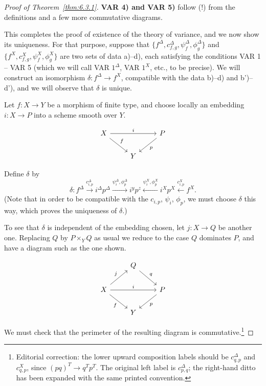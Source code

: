 \begin{proof}[Proof of Theorem~\ref{thm:6.3.1}]
\medskip\noindent\textbf{VAR 4) and VAR 5)} follow (!) from the definitions and a few more commutative diagrams.

This completes the proof of existence of the theory of variance, and we now show its uniqueness. For that purpose, suppose that $\{f^{\Delta}, c^{\Delta}_{f,g}, \psi^{\Delta}_{f}, \phi^{\Delta}_{g}\}$ and $\{f^{X}, c^{X}_{f,g}, \psi^{X}_{f}, \phi^{X}_{g}\}$ are two sets of data a)--d), each satisfying the conditions VAR 1 -- VAR 5 (which we will call VAR $1^{\Delta}$, VAR $1^{X}$, etc., to be precise). We will construct an isomorphism $\delta\colon f^{\Delta}\to f^{X}$, compatible with the data b)--d) and b')--d'), and we will observe that $\delta$ is unique.

Let $f\colon X\to Y$ be a morphism of finite type, and choose locally an embedding $i\colon X\to P$ into a scheme smooth over $Y$.

\[\begin{tikzcd}
	X\arrow[rr, "i"]\arrow[rd, "f"]&&P\arrow[ld, "p"]\\
	&Y
\end{tikzcd}\]

Define $\delta$ by
\[
\delta\colon f^{\Delta} \xrightarrow{c^{\Delta}_{i,p}} i^{\Delta} p^{\Delta} \xrightarrow{\psi^{\Delta}_{i}, \phi^{\Delta}_{p}} i^{y} p^{z} \xleftarrow{\psi^{X}_{i}, \phi^{X}_{p}} i^{X} p^{X} \xleftarrow{c^{X}_{i,p}} f^{X}.
\]
(Note that in order to be compatible with the $c_{i,p}$, $\psi_i$, $\phi_p$, we must choose $\delta$ this way, which proves the uniqueness of $\delta$.)

\par\endgroup

To see that $\delta$ is independent of the embedding chosen, let $j\colon X\to Q$ be another one. Replacing $Q$ by $P\times_Y Q$ as usual we reduce to the case $Q$ dominates $P$, and have a diagram such as the one shown.

\[
\begin{tikzcd}
& Q \ar[rd,"q"] \\
X \ar[ru,"j"] \ar[rr,"i"] \ar[rd,"f"'] && P \ar[ld,"p"] \\
&Y
\end{tikzcd}
\]

We must check that the perimeter of the resulting diagram is commutative.\footnote{Editorial correction: the lower upward composition labels should be $c^\Delta_{q,p}$ and $c^X_{q,p}$, since $(pq)^T\to q^Tp^T$. The original left label is $c^\Delta_{p,q}$; the right-hand ditto has been expanded with the same printed convention.}


\end{proof}
